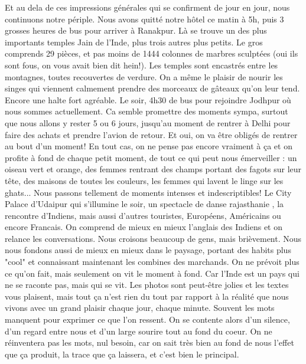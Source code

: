 \begin{multicols}{2}
Et au dela de ces impressions générales qui se confirment de jour en jour, nous continuons notre périple. Nous avons quitté notre hôtel ce matin à 5h, puis 3 grosses heures de bus pour arriver à Ranakpur. Là se trouve un des plus importants temples Jain de l'Inde, plus trois autres plus petits. Le gros comprends 29 pièces, et pas moins de 1444 colonnes de marbres sculptées (oui ils sont fous, on vous avait bien dit hein!). Les temples sont encastrés entre les montagnes, toutes recouvertes de verdure. On a même le plaisir de nourir les singes qui viennent calmement prendre des morceaux de gâteaux qu'on leur tend. Encore une halte fort agréable. Le soir, 4h30 de bus pour rejoindre Jodhpur où nous sommes actuellement. Ca semble promettre des moments sympa, surtout que nous allons y rester 5 ou 6 jours, jusqu'au moment de rentrer à Delhi pour faire des achats et prendre l'avion de retour. Et oui, on va être obligés de rentrer au bout d'un moment! En tout cas, on ne pense pas encore vraiment à ça et on profite à fond de chaque petit moment, de tout ce qui peut nous émerveiller : un oiseau vert et orange, des femmes rentrant des champs portant des fagots sur leur tête, des maisons de toutes les couleurs, les femmes qui lavent le linge sur les ghats... Nous passons tellement de moments intenses et indescriptibles! Le City Palace d'Udaipur qui s'illumine le soir, un spectacle de danse rajasthanie , la rencontre d'Indiens, mais aussi d'autres touristes, Européens, Américains ou encore Francais. On comprend de mieux en mieux l'anglais des Indiens et on relance les conversations. Nous croisons beaucoup de gens, mais brièvement. Nous nous fondons aussi de mieux en mieux dans le paysage, portant des habits plus "cool" et connaissant maintenant les combines des marchands. On ne prévoit plus ce qu'on fait, mais seulement on vit le moment à fond. Car l'Inde est un pays qui ne se raconte pas, mais qui se vit. Les photos sont peut-être jolies et les textes vous plaisent, mais tout ça n'est rien du tout par rapport à la réalité que nous vivons avec un grand plaisir chaque jour, chaque minute. Souvent les mots manquent pour exprimer ce que l'on ressent. On se contente alors d'un silence, d'un regard entre nous et d'un large sourire tout au fond du coeur. On ne réinventera pas les mots, nul besoin, car on sait très bien au fond de nous l'effet que ça produit, la trace que ça laissera, et c'est bien le principal.



\end{multicols}
